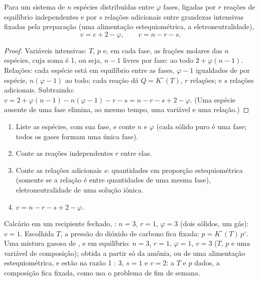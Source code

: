 \begin{theorem}\label{thm:b2:equilibrium-shifts:phase-rule}
Para um sistema de $n$ espécies distribuídas entre $\varphi$ fases, ligadas por $r$
reações de equilíbrio independentes e por $s$ relações adicionais entre
grandezas intensivas fixadas pela preparação (uma alimentação
estequiométrica, a eletroneutralidade),
\[
  v = c + 2 - \varphi, \qquad c = n - r - s .
\]
\end{theorem}

\begin{proof}
Variáveis intensivas: $T$, $p$ e, em cada fase, as frações molares das
$n$ espécies, cuja soma é 1, ou seja, $n - 1$ livres por fase: ao todo $2 +
\varphi(n - 1)$. Relações: cada espécie está em equilíbrio entre as
fases, $\varphi - 1$ igualdades de  por espécie, $n(\varphi -
1)$ ao todo; cada reação dá $Q = K^\circ(T)$, $r$ relações; e $s$
relações adicionais. Subtraindo: $v = 2 + \varphi(n - 1) - n(\varphi - 1) - r -
s = n - r - s + 2 - \varphi$. (Uma espécie ausente de uma fase elimina, ao
mesmo tempo, uma variável e uma relação.)
\end{proof}

\begin{method}\label{met:b2:equilibrium-shifts:variance}
\begin{enumerate}
  \item Liste as espécies, com sua fase, e conte $n$ e $\varphi$
        (cada sólido puro é uma fase; todos os gases formam uma única fase).
  \item Conte as reações independentes $r$ entre elas.
  \item Conte as relações adicionais $s$: quantidades em proporção
        estequiométrica (somente se a relação é entre quantidades de uma
        mesma fase), eletroneutralidade de uma solução iônica.
  \item $v = n - r - s + 2 - \varphi$.
\end{enumerate}
\end{method}

\begin{example}\label{ex:b2:equilibrium-shifts:variances}
Calcário em um recipiente fechado, : $n = 3$, $r =
1$, $\varphi = 3$ (dois sólidos, um gás): $v = 1$. Escolhida $T$, a pressão
do dióxido de carbono fica fixada: $p = K^\circ(T)\,p^\circ$. Uma mistura gasosa de
,  e  em equilíbrio: $n = 3$, $r = 1$, $\varphi = 1$, $v
= 3$ ($T$, $p$ e uma variável de composição); obtida a partir só da amônia, ou
de uma alimentação estequiométrica,  e  estão na razão 1 : 3, $s = 1$ e
$v = 2$: a $T$ e $p$ dados, a composição fica fixada, como usa o problema de
fim de semana.
\end{example}

